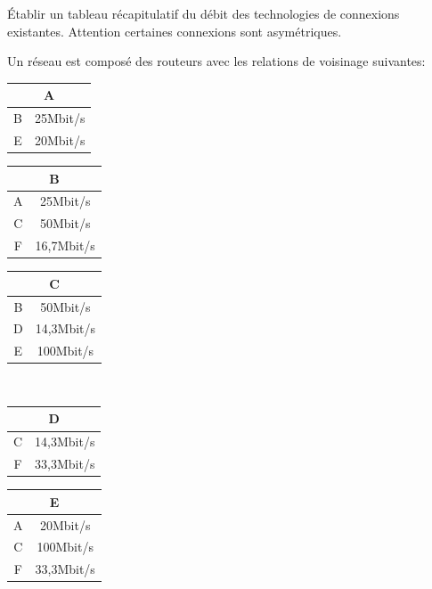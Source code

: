 \documentclass[a4paper,11pt]{article}
\begin{document}
\begin{exo}
Établir un tableau récapitulatif du débit des technologies de connexions existantes. Attention certaines connexions sont asymétriques.
\end{exo}
\begin{exo}
Un réseau est composé des routeurs avec les relations de voisinage suivantes:
\begin{center}
    \begin{tabular}{|c|c|}
        \hline
        \multicolumn{2}{|c|}{A}\\
        \hline
        B & 25Mbit/s\\
        \hline
        E & 20Mbit/s\\
        \hline
    \end{tabular}
    \begin{tabular}{|c|c|}
        \hline
        \multicolumn{2}{|c|}{B}\\
        \hline
        A & 25Mbit/s\\
        \hline
        C & 50Mbit/s\\
        \hline
        F & 16,7Mbit/s\\
        \hline
    \end{tabular} 
    \begin{tabular}{|c|c|}
        \hline
        \multicolumn{2}{|c|}{C}\\
        \hline
        B & 50Mbit/s\\
        \hline
        D & 14,3Mbit/s\\
        \hline
        E & 100Mbit/s\\
        \hline
    \end{tabular} 
\\
    \begin{tabular}{|c|c|}
        \hline
        \multicolumn{2}{|c|}{D}\\
        \hline
        C & 14,3Mbit/s\\
        \hline
        F & 33,3Mbit/s\\
        \hline
    \end{tabular} 
    \begin{tabular}{|c|c|}
        \hline
        \multicolumn{2}{|c|}{E}\\
        \hline
        A & 20Mbit/s\\
        \hline
        C & 100Mbit/s\\
        \hline
        F & 33,3Mbit/s\\
        \hline
    \end{tabular} 

\end{center}
\end{exo}
\end{document}
